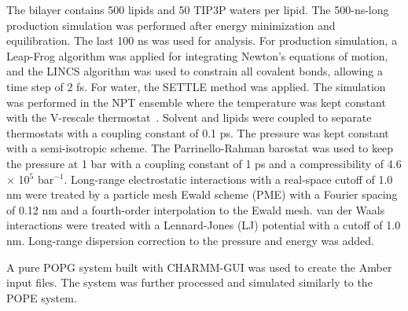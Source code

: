 \documentclass[journal=jpcbfk]{achemso}
\begin{document}
The bilayer contains 500 lipids and 50 TIP3P waters per lipid.
The 500-ns-long production simulation was performed after energy minimization and equilibration.
The last 100 ns was used for analysis.
For production simulation, a Leap-Frog algorithm was applied for integrating Newton's equations of motion, and the LINCS algorithm was used to constrain all covalent bonds, allowing a time step of 2 fs. For water, the SETTLE method was applied. The simulation was performed in the NPT ensemble where the temperature was kept constant with the V-rescale thermostat~\cite{bussi07}.
Solvent and lipids were coupled to separate thermostats with a coupling constant of 0.1 ps. The pressure was kept constant with a semi-isotropic scheme. The Parrinello-Rahman barostat was used to keep the pressure at 1 bar with a coupling constant of 1 ps and a compressibility of 4.6 $\times$ 10$^5$ bar$^{-1}$. Long-range electrostatic interactions with a real-space cutoff of 1.0 nm were treated by a particle mesh Ewald scheme (PME) with a Fourier spacing of 0.12 nm and a fourth-order interpolation to the Ewald mesh. van der Waals interactions were treated with a Lennard-Jones (LJ) potential with a cutoff of 1.0 nm. Long-range dispersion correction to the pressure and energy was added.

A pure POPG system built with CHARMM-GUI was used to create the Amber input files.
The system was further processed and simulated similarly to the POPE system. 

\end{document}
